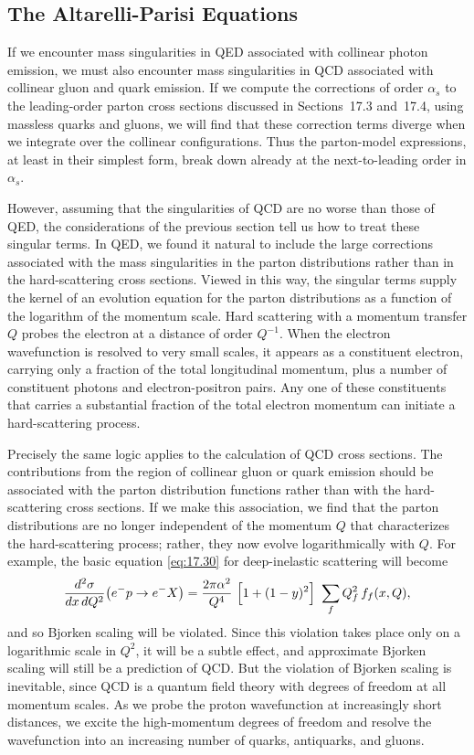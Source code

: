 \subsection{The Altarelli-Parisi Equations}

If we encounter mass singularities in QED associated with collinear photon
emission, we must also encounter mass singularities in QCD associated with
collinear gluon and quark emission.  If we compute the corrections of order
$\alpha_s$ to the leading-order parton cross sections discussed in
Sections~17.3 and~17.4, using massless quarks and gluons, we will find that
these correction terms diverge when we integrate over the collinear
configurations.  Thus the parton-model expressions, at least in their
simplest form, break down already at the next-to-leading order in
$\alpha_s$.

However, assuming that the singularities of QCD are no worse than those of
QED, the considerations of the previous section tell us how to treat these
singular terms.  In QED, we found it natural to include the large corrections
associated with the mass singularities in the parton distributions rather
than in the hard-scattering cross sections.  Viewed in this way, the singular
terms supply the kernel of an evolution equation for the parton distributions
as a function of the logarithm of the momentum scale.  Hard scattering with a
momentum transfer $Q$ probes the electron at a distance of order $Q^{-1}$.
When the electron wavefunction is resolved to very small scales, it appears as
a constituent electron, carrying only a fraction of the total longitudinal
momentum, plus a number of constituent photons and electron-positron pairs.
Any one of these constituents that carries a substantial fraction of the
total electron momentum can initiate a hard-scattering process.

Precisely the same logic applies to the calculation of QCD cross sections.
The contributions from the region of collinear gluon or quark emission should
be associated with the parton distribution functions rather than with the
hard-scattering cross sections.  If we make this association, we find that
the parton distributions are no longer independent of the momentum $Q$ that
characterizes the hard-scattering process; rather, they now evolve
logarithmically with $Q$.  For example, the basic equation \eqref{eq:17.30}
for deep-inelastic scattering will become
\begin{equation}
  \frac{d^2\sigma}{dx\,dQ^2}\bigl( e^{-}p \to e^{-}X \bigr)
  = \frac{2\pi\alpha^2}{Q^4}\ \Bigl[ 1 + (1-y)^2 \Bigr]\ \sum_f Q_f^2\,
    f_f(x, Q) ,
  \label{eq:17.125}
\end{equation}
and so Bjorken scaling will be violated.  Since this violation takes place
only on a logarithmic scale in $Q^2$, it will be a subtle effect, and
approximate Bjorken scaling will still be a prediction of QCD.  But the
violation of Bjorken scaling is inevitable, since QCD is a quantum field
theory with degrees of freedom at all momentum scales.  As we probe the
proton wavefunction at increasingly short distances, we excite the
high-momentum degrees of freedom and resolve the wavefunction into an
increasing number of quarks, antiquarks, and gluons.

